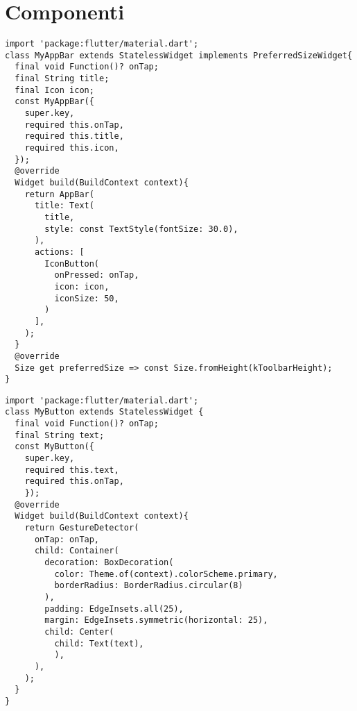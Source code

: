 \section{Componenti}
\begin{lstlisting}[style=pythonstyle,caption={Codice del my\_appbar.dart}, label={lst:appbar}]
import 'package:flutter/material.dart';
class MyAppBar extends StatelessWidget implements PreferredSizeWidget{
  final void Function()? onTap;
  final String title;
  final Icon icon;
  const MyAppBar({
    super.key,
    required this.onTap,
    required this.title,
    required this.icon,
  });
  @override
  Widget build(BuildContext context){
    return AppBar(
      title: Text(
        title,
        style: const TextStyle(fontSize: 30.0),
      ),
      actions: [
        IconButton(
          onPressed: onTap,
          icon: icon,
          iconSize: 50,
        )
      ],
    );
  }
  @override
  Size get preferredSize => const Size.fromHeight(kToolbarHeight);
}
\end{lstlisting}
\begin{lstlisting}[style=pythonstyle,caption={Codice del my\_button.dart}, label={lst:button}]
import 'package:flutter/material.dart';
class MyButton extends StatelessWidget {
  final void Function()? onTap;
  final String text;
  const MyButton({
    super.key,
    required this.text,
    required this.onTap,
    });
  @override
  Widget build(BuildContext context){
    return GestureDetector(
      onTap: onTap,
      child: Container(
        decoration: BoxDecoration(
          color: Theme.of(context).colorScheme.primary,
          borderRadius: BorderRadius.circular(8)
        ),
        padding: EdgeInsets.all(25),
        margin: EdgeInsets.symmetric(horizontal: 25),
        child: Center(
          child: Text(text),
          ),
      ),
    );
  }
}
\end{lstlisting}
